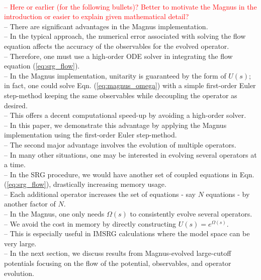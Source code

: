 \documentclass[preprintnumbers,floatfix,aps,prc,preprint,nofootinbib]{revtex4-1}
\begin{document}
\\
\textcolor{red}{%
-- Here or earlier (for the following bullets)? Better to motivate the Magnus in the introduction or easier to explain given mathematical detail?
}
\\
-- There are significant advantages in the Magnus implementation.
\\
-- In the typical approach, the numerical error associated with solving the flow equation affects the accuracy of the observables for the evolved operator.
\\
-- Therefore, one must use a high-order ODE solver in integrating the flow equation (\ref{eq:srg_flow}).
\\
-- In the Magnus implementation, unitarity is guaranteed by the form of $U(s)$; in fact, one could solve Eqn. (\ref{eq:magnus_omega}) with a simple first-order Euler step-method keeping the same observables while decoupling the operator as desired.
\\
-- This offers a decent computational speed-up by avoiding a high-order solver.
\\
-- In this paper, we demonstrate this advantage by applying the Magnus implementation using the first-order Euler step-method.
\\
-- The second major advantage involves the evolution of multiple operators.
\\
-- In many other situations, one may be interested in evolving several operators at a time.
\\
-- In the SRG procedure, we would have another set of coupled equations in Eqn. (\ref{eq:srg_flow}), drastically increasing memory usage.
\\
-- Each additional operator increases the set of equations - say $N$ equations - by another factor of $N$.
\\
-- In the Magnus, one only needs $\Omega(s)$ to consistently evolve several operators.
\\
-- We avoid the cost in memory by directly constructing $U(s)=e^{\Omega(s)}$.
\\
-- This is especially useful in IMSRG calculations where the model space can be very large.
\\
-- In the next section, we discuss results from Magnus-evolved large-cutoff potentials focusing on the flow of the potential, observables, and operator evolution.


\end{document}
